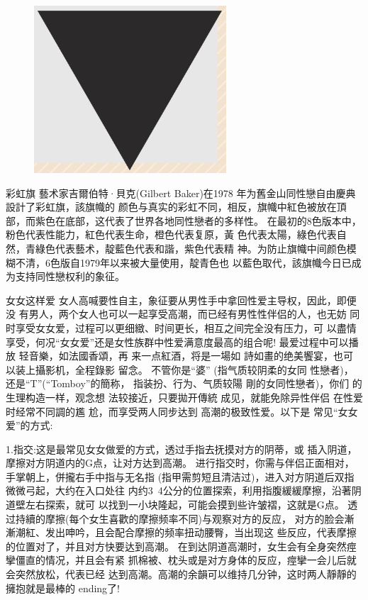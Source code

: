 \documentclass[12pt,UTF8]{ctexbook}
\begin{document}
\begin{figure}[htbp]
	\centering
	\includegraphics[width=0.7\linewidth]{9}
	\caption{}
	\label{fig:1}
\end{figure}

彩虹旗
藝术家吉爾伯特·貝克(Gilbert Baker)在1978
年为舊金山同性戀自由慶典設計了彩虹旗，該旗幟的
颜色与真实的彩虹不同，相反，旗幟中紅色被放在頂
部，而紫色在底部，这代表了世界各地同性戀者的多样性。
在最初的8色版本中，粉色代表性能力，紅色代表生命，橙色代表复原，黃
色代表太陽，綠色代表自然，青綠色代表藝术，靛藍色代表和諧，紫色代表精
神。为防止旗幟中间颜色模糊不清，6色版自1979年以来被大量使用，靛青色也
以藍色取代，該旗幟今日已成为支持同性戀权利的象征。

女女这样爱
女人高喊要性自主，象征要从男性手中拿回性爱主导权，因此，即便没
有男人，两个女人也可以一起享受高潮，而已经有男性性伴侣的人，也无妨
同时享受女女爱，过程可以更细緻、时间更长，相互之间完全没有压力，可
以盡情享受，何况“女女爱”还是女性族群中性爱满意度最高的组合呢!
最爱过程中可以播放
轻音樂，如法國香頌，再
来一点紅酒，将是一場如
詩如畫的绝美饗宴，也可
以装上攝影机，全程錄影
留念。
不管你是“婆”
(指气质较阴柔的女同
性戀者)，还是“T”(“Tomboy”的簡称，
指装扮、行为、气质较陽
剛的女同性戀者)，你们
的生理构造一样，观念想
法较接近，只要拋开傳統
成见，就能免除异性伴侣
在性爱时经常不同調的尷
尬，而享受两人同步达到
高潮的极致性爱。以下是
常见“女女爱”的方式:

1.指交:这是最常见女女做爱的方式，透过手指去抚摸对方的阴蒂，或
插入阴道，摩擦对方阴道内的G点，让对方达到高潮。
进行指交时，你需与伴侣正面相对，手掌朝上，併攏右手中指与无名指
(指甲需剪短且清洁过)，进入对方阴道后双指微微弓起，大约在入口处往
内约3~4公分的位置探索，利用指腹緩緩摩擦，沿著阴道壁左右探索，就可
以找到一小块隆起，可能会摸到些许皱褶，这就是G点。
透过持續的摩擦(每个女生喜歡的摩擦频率不同)与观察对方的反应，
对方的脸会漸漸潮紅、发出呻吟，且会配合摩擦的频率扭动腰臀，当出现这
些反应，代表摩擦的位置对了，并且对方快要达到高潮。
在到达阴道高潮时，女生会有全身突然痙攣僵直的情况，并且会有紧
抓棉被、枕头或是对方身体的反应，痙攣一会儿后就会突然放松，代表已经
达到高潮。高潮的余韻可以维持几分钟，这时两人靜靜的擁抱就是最棒的
ending了!
\end{document}
